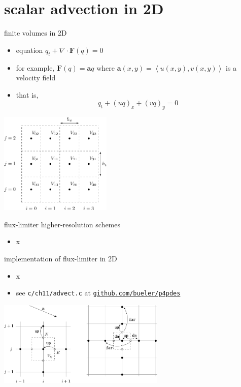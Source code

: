 \documentclass[10pt,hyperref]{beamer}
\newcommand{\ba}{\mathbf{a}}
\newcommand{\bF}{\mathbf{F}}
\newcommand{\Div}{\nabla\cdot}
\begin{document}
\section{scalar advection in 2D}

\begin{frame}{finite volumes in 2D}

\begin{itemize}
\item equation $q_t + \Div \bF(q) = 0$
\item for example, $\bF(q) = \ba q$ where $\ba(x,y) = \left<u(x,y), v(x,y)\right>$ is a velocity field
\item that is,
    $$q_t + (u q)_x + (v q)_y = 0$$
\end{itemize}

\hfill \includegraphics[width=0.4\textwidth]{figs/bueler11p1}
\end{frame}


\begin{frame}{flux-limiter higher-resolution schemes}

\begin{itemize}
\item x
\end{itemize}
\end{frame}


\begin{frame}{implementation of flux-limiter in 2D}

\begin{itemize}
\item x
\item see \texttt{c/ch11/advect.c} at \href{https://github.com/bueler/p4pdes}{\texttt{github.com/bueler/p4pdes}}
\end{itemize}

\begin{center}
\includegraphics[width=0.6\textwidth]{figs/bueler11p8}
\end{center}

\end{frame}
\end{document}
